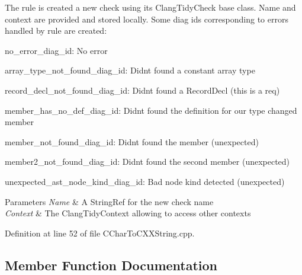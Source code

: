 The rule is created a new check using its {\ttfamily Clang\+Tidy\+Check} base class. Name and context are provided and stored locally. Some diag ids corresponding to errors handled by rule are created\+:
\begin{DoxyItemize}
\item no\+\_\+error\+\_\+diag\+\_\+id\+: No error
\item array\+\_\+type\+\_\+not\+\_\+found\+\_\+diag\+\_\+id\+: Didn\textquotesingle{}t found a constant array type
\item record\+\_\+decl\+\_\+not\+\_\+found\+\_\+diag\+\_\+id\+: Didn\textquotesingle{}t found a Record\+Decl (this is a req)
\item member\+\_\+has\+\_\+no\+\_\+def\+\_\+diag\+\_\+id\+: Didn\textquotesingle{}t found the definition for our type changed member
\item member\+\_\+not\+\_\+found\+\_\+diag\+\_\+id\+: Didn\textquotesingle{}t found the member (unexpected)
\item member2\+\_\+not\+\_\+found\+\_\+diag\+\_\+id\+: Didn\textquotesingle{}t found the second member (unexpected)
\item unexpected\+\_\+ast\+\_\+node\+\_\+kind\+\_\+diag\+\_\+id\+: Bad node kind detected (unexpected)
\end{DoxyItemize}


\begin{DoxyParams}{Parameters}
{\em Name} & A String\+Ref for the new check name \\
\hline
{\em Context} & The Clang\+Tidy\+Context allowing to access other contexts \\
\hline
\end{DoxyParams}


Definition at line 52 of file C\+Char\+To\+C\+X\+X\+String.\+cpp.



\subsection{Member Function Documentation}
\mbox{\label{classclang_1_1tidy_1_1pagesjaunes_1_1_c_char_to_c_x_x_string_aebfaf36f2199b0b53bbf7e1241f09b77}} 
